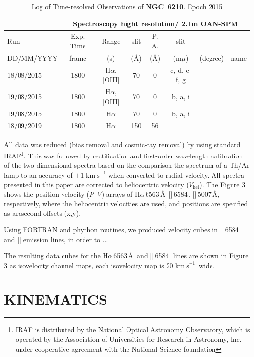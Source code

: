 \documentclass{aa}
\makeatletter
\newcommand{\kms}{\ensuremath{\mathrm{km\ s}^{-1}}}
\newcommand{\oiii}{[\ion{O}{3}]}
\newcommand\NIIlam{[\ion{N}{2}]\,6584\,}
\newcommand\OIIIlam{[\ion{O}{3}]\,5007\,\AA\@}
\newcommand\Halam{H$\alpha$\,6563\,\AA\@}
\newcommand{\vhel}{\ensuremath{V_\mathrm{hel}}}
\makeatother
\begin{document}
\begin{table}[!t]
\centering
\caption{Log  of Time-resolved  Observations of {\bf NGC~6210}. Epoch 2015}
\begin{tabular}{l|ccccccc} \hline 
&  \multicolumn{7}{c}{Spectroscopy hight resolution/ 2.1m  OAN-SPM}            \\[0.1pt]
\hline 
Run   &   Exp. Time & Range  & slit & P. A.   & slit        \\
DD/MM/YYYY   &     frame         &    (s)   &  (\AA)    &    (\AA)  & (m$\mu$) & (degree) & name    \\[1pt]   \hline 
18/08/2015  &  1800 &   H$\alpha$, [OIII]  & 70 & 0 & c, d, e, f, g\\
19/08/2015  &  1800 &   H$\alpha$, [OIII]   & 70 & 0 & b, a, i\\
19/08/2015  &  1800 &   H$\alpha$    & 70 & 0 & b, a, i\\
18/09/2019  &  1800 &   H$\alpha$    & 150 & 56 & \\

\hline
\hline 
\end{tabular}
\label{table:pa5}
\end{table}

All data was reduced (bias removal 
and cosmic-ray removal) by using standard IRAF\footnote{IRAF is
  distributed by the National Optical Astronomy Observatory, which is
  operated by the Association of Universities for Research in
  Astronomy, Inc. under cooperative agreement with the National
  Science foundation}.
  This was followed by rectification and first-order wavelength 
  calibration of the two-dimensional spectra based on the comparison
  the spectrum
of a Th/Ar lamp to an accuracy of $\pm$1 \kms{} when converted to
radial velocity.  All spectra presented in this paper are corrected to
heliocentric velocity (\vhel). 
The Figure 3 shows the position-velocity ({\it P-V})  arrays of \Halam\,
\NIIlam \A, \OIIIlam, respectively, where the heliocentric velocities are used,
and positions are specified as arcsecond offsets (x,y).

Using FORTRAN and phython routines, we produced  velocity cubes in  \NIIlam{} and \oiii{} emission lines, in order to 
...

The resulting data cubes for the \Halam\, and \NIIlam\, lines are shown
in Figure 3 as isovelocity channel maps, each isovelocity map is 20
\kms\, wide. 


\section{KINEMATICS}
\label{sec:kinematic}
\end{document}
